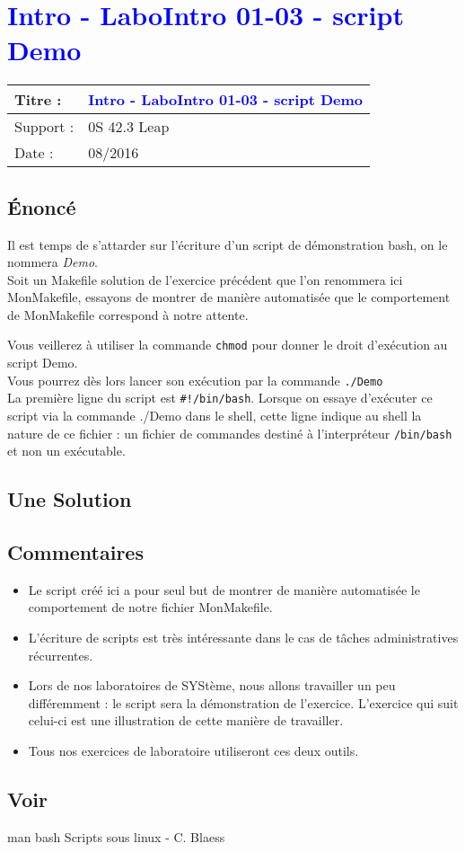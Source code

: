 \lstset{language=c}
\renewcommand{\titre}{\textcolor{blue}{ Intro - LaboIntro 01-03 - script Demo}}

\lhead{ \titre }
\section{{\titre} }

\begin{tabular}{|l|l|}
\hline
Titre : 	& \titre \\\hline
Support : 	& 0S 42.3 Leap\\\hline
Date :		& 08/2016 \\\hline
\end{tabular}

\subsection{Énoncé}
Il est temps de s'attarder sur l'écriture d'un script de démonstration bash, on le nommera \emph{Demo}.\\
Soit un Makefile solution de l'exercice précédent que l'on renommera ici MonMakefile, essayons de montrer de manière automatisée que le comportement de MonMakefile correspond à notre attente. 

Vous veillerez à utiliser la commande \texttt{chmod} pour donner le droit d'exécution au script Demo.\\
Vous pourrez dès lors lancer son exécution par la commande \texttt{./Demo}\\
La première ligne du script est \texttt {\#!/bin/bash}. Lorsque on essaye d'exécuter ce script via la commande ./Demo dans le shell, cette ligne indique au shell la nature de ce fichier : un fichier de commandes destiné à l'interpréteur \texttt{/bin/bash} et non un exécutable.\\

\subsection{Une Solution}



\subsection{Commentaires}

\begin{itemize}
\item Le script créé ici a pour seul but de montrer de manière automatisée le comportement de notre fichier MonMakefile. 
\item L'écriture de scripts est très intéressante dans le cas de tâches administratives récurrentes.
\item Lors de nos laboratoires de SYStème, nous allons travailler un peu différemment : le script sera la démonstration de l'exercice. L'exercice  qui suit celui-ci est une illustration de cette manière de travailler.
\item Tous nos exercices de laboratoire utiliseront ces deux outils. 
\end{itemize}
\subsection{Voir}
man bash
Scripts sous linux - C. Blaess
\newpage
